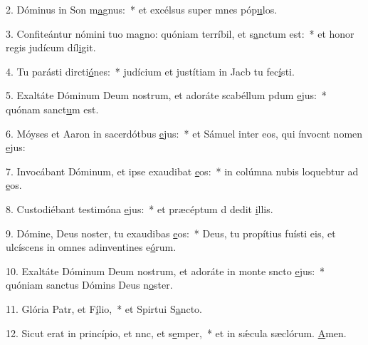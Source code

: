 2. Dóminus in Son m\uline{a}gnus:~* et excélsus super mnes póp\uline{u}los.\par 
3. Confiteántur nómini tuo magno: quóniam terríbil, et s\uline{a}nctum est:~* et honor regis judícum díl\uline{i}git.\par 
4. Tu parásti dircti\uline{ó}nes:~* judícium et justítiam in Jacb tu fec\uline{í}sti.\par 
5. Exaltáte Dóminum Deum nostrum, et adoráte scabéllum pdum \uline{e}jus:~* quónam sanct\uline{u}m est.\par 
6. Móyses et Aaron in sacerdótbus \uline{e}jus:~* et Sámuel inter eos, qui ínvocnt nomen \uline{e}jus:\par 
7. Invocábant Dóminum, et ipse exaudibat \uline{e}os:~* in colúmna nubis loquebtur ad \uline{e}os.\par 
8. Custodiébant testimóna \uline{e}jus:~* et præcéptum d dedit \uline{i}llis.\par 
9. Dómine, Deus noster, tu exaudibas \uline{e}os:~* Deus, tu propítius fuísti eis, et ulcíscens in omnes adinventines e\uline{ó}rum.\par 
10. Exaltáte Dóminum Deum nostrum, et adoráte in monte sncto \uline{e}jus:~* quóniam sanctus Dómins Deus n\uline{o}ster.\par 
11. Glória Patr, et F\uline{í}lio,~* et Spirtui S\uline{a}ncto.\par 
12. Sicut erat in princípio, et nnc, et s\uline{e}mper,~* et in sǽcula sæclórum. \uline{A}men.\par 

